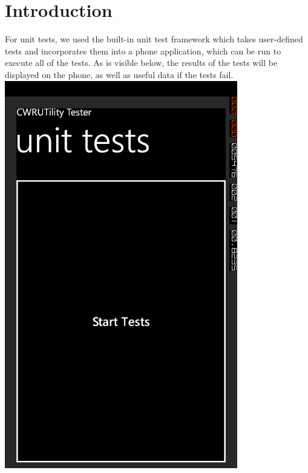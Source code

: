 \documentclass[pdftex,12pt,letter]{article}
\begin{document}
\section{Introduction}
For unit tests, we used the built-in unit test framework which takes user-defined tests and incorporates them into a phone application, which can be run to execute all of the tests. As is visible below, the results of the tests will be displayed on the phone, as well as useful data if the tests fail.
\includegraphics[width=4in]{ss1.png}
\FloatBarrier
\end{document}
